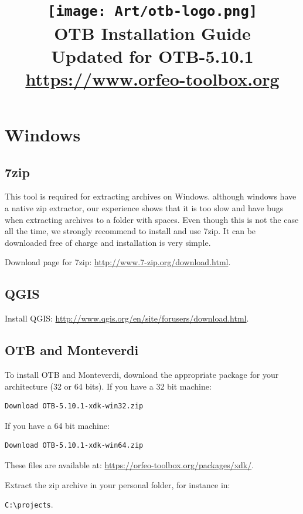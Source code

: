 \documentclass[10pt,a4paper]{article}
\title{\texttt{[image: Art/otb-logo.png]}\\
  OTB Installation Guide\\
  Updated for OTB-5.10.1\\
  {\small\url{https://www.orfeo-toolbox.org}}
}
\begin{document}
\maketitle

\tableofcontents

\clearpage

\section{Windows}

\subsection{7zip}
This tool is required for extracting archives on Windows. although windows have
a native zip extractor, our experience shows that it is too slow and have bugs
when extracting archives to a folder with spaces. Even though this is not the
case all the time, we strongly recommend to install and use 7zip. It can be
downloaded free of charge and installation is very simple.

Download page for 7zip: \url{http://www.7-zip.org/download.html}.

\subsection{QGIS}
Install QGIS: \url{http://www.qgis.org/en/site/forusers/download.html}.

\subsection{OTB and Monteverdi}

To install OTB and Monteverdi, download the appropriate package for your
architecture (32 or 64 bits). If you have a 32 bit machine:

\begin{verbatim}
Download OTB-5.10.1-xdk-win32.zip
\end{verbatim}

If you have a 64 bit machine:

\begin{verbatim}
Download OTB-5.10.1-xdk-win64.zip
\end{verbatim}

These files are available at:
\url{https://orfeo-toolbox.org/packages/xdk/}.

Extract the zip archive in your personal folder, for instance in:\\
\begin{centering}
\texttt{C:{\textbackslash}projects}.
\end{centering}
\end{document}
